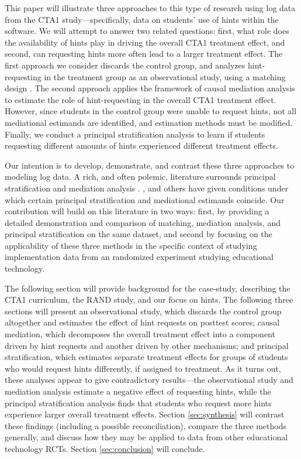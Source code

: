 \documentclass{article}\usepackage[]{graphicx}\usepackage[]{color}
\begin{document}
This paper will illustrate three approaches to this type of research
using log data from the CTA1 study---specifically, data on students' use
of hints within the software.
We will attempt to answer two related questions: first, what role does
the availability of hints play in driving the overall CTA1 treatment
effect, and second, can requesting hints more often lead to a larger
treatment effect.
The first approach we consider discards the control group, and analyzes
hint-requesting in the treatment group as an observational study,
using a matching design
\citep[c.f.][]{rosenbaum2002observational}. The
second approach applies the framework of causal mediation analysis
\citep{vanderweele2015explanation,hong2015causality,imai2011unpacking} to estimate the role of
hint-requesting in the overall CTA1 treatment effect. However, since
students in the control group were unable to request hints, not all
mediational estimands are identified, and estimation methods must be
modified.
Finally, we conduct a principal stratification analysis
\citep{frangakis} to learn if students requesting different amounts of
hints experienced different treatment effects.

Our intention is to develop, demonstrate, and contrast these three
approaches to modeling log data.
A rich, and often polemic, literature surrounds principal
stratification and mediation analysis
\citep[e.g.][]{rubin2004direct,vanderweele2011principal,pearl2011principal,mealli2012refreshing,vanderweele2012comments}.
\citet{vanderweele2008simple}, \citet{jo2008causal} and others have
given conditions under which certain principal stratification and mediational
estimands coincide.
Our contribution will build on this literature in two ways: first, by
providing a detailed demonstration and comparison of matching, mediation analysis,
and principal stratification on the same dataset, and second by
focusing on the applicability of these three methods in the specific
context of studying implementation data from an randomized
experiment studying educational technology.

The following section will provide background for the case-study,
describing the CTA1 curriculum, the RAND study, and our focus on
hints.
The following three sections will present an observational study,
which discards the control group altogether and estimates the effect
of hint requests on posttest scores;
causal mediation, which decomposes the overall treatment effect into a
component driven by hint requests and another driven by other
mechanisms; and principal stratification, which estimates separate
treatment effects for groups of students who would request hints
differently, if assigned to treatment.
As it turns out, these analyses appear to give contradictory
results---the observational study and mediation analysis estimate a
negative effect of requesting hints, while the principal
stratification analysis finds that students who request more hints
experience larger overall treatment effects.
Section \ref{sec:synthesis} will contrast these findings (including a
possible reconciliation), compare the three methods generally,
and discuss how they may be applied to data from other educational
technology RCTs.
Section \ref{sec:conclusion} will conclude.
\end{document}

